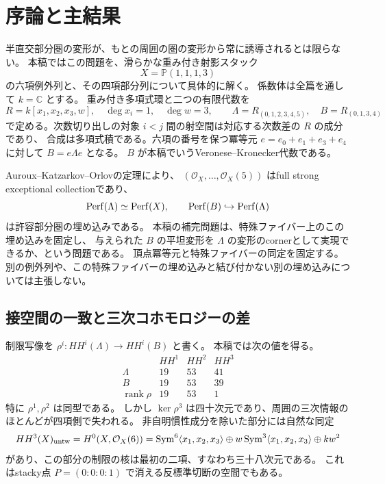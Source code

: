 \section{序論と主結果}

半直交部分圏の変形が、もとの周囲の圏の変形から常に誘導されるとは限らない。
本稿ではこの問題を、滑らかな重み付き射影スタック
\[
 X=\mathbb P(1,1,1,3)
\]
の六項例外列と、その四項部分列について具体的に解く。
係数体は全篇を通して $k=\mathbb C$ とする。
重み付き多項式環と二つの有限代数を
\[
 R=k[x_1,x_2,x_3,w],\quad \deg x_i=1,\quad\deg w=3,
 \qquad \Lambda=R_{(0,1,2,3,4,5)},\quad B=R_{(0,1,3,4)}
\]
で定める。次数切り出しの対象 $i<j$ 間の射空間は対応する次数差の $R$ の成分であり、
合成は多項式積である。六項の番号を保つ冪等元
$e=e_0+e_1+e_3+e_4$ に対して $B=e\Lambda e$ となる。
$B$ が本稿でいうVeronese--Kronecker代数である。

Auroux--Katzarkov--Orlovの定理\cite[Theorem 2.12]{AKO}により、
$(\mathcal O_X,\ldots,\mathcal O_X(5))$ はfull strong exceptional collectionであり、
\[
 \operatorname{Perf}(\Lambda)\simeq\operatorname{Perf}(X),\qquad
 \operatorname{Perf}(B)\hookrightarrow\operatorname{Perf}(\Lambda)
\]
は許容部分圏の埋め込みである。
本稿の補完問題は、特殊ファイバー上のこの埋め込みを固定し、
与えられた $B$ の平坦変形を $\Lambda$ の変形のcornerとして実現できるか、という問題である。
頂点冪等元と特殊ファイバーの同定を固定する。
別の例外列や、この特殊ファイバーの埋め込みと結び付かない別の埋め込みについては主張しない。

\subsection{接空間の一致と三次コホモロジーの差}

制限写像を $\rho^i:HH^i(\Lambda)\to HH^i(B)$ と書く。
本稿では次の値を得る。
\[
\begin{array}{c|rrr}
 &HH^1&HH^2&HH^3\\\hline
 \Lambda&19&53&41\\
 B&19&53&39\\
 \operatorname{rank}\rho&19&53&1
\end{array}
\]
特に $\rho^1,\rho^2$ は同型である。
しかし $\ker\rho^3$ は四十次元であり、周囲の三次情報のほとんどが四項側で失われる。
非自明慣性成分を除いた部分には自然な同定
\[
 HH^3(X)_{\rm untw}=H^0(X,\mathcal O_X(6))
 =\operatorname{Sym}^6\langle x_1,x_2,x_3\rangle
 \oplus w\operatorname{Sym}^3\langle x_1,x_2,x_3\rangle\oplus kw^2
\]
があり、この部分の制限の核は最初の二項、すなわち三十八次元である。
これはstacky点 $P=(0:0:0:1)$ で消える反標準切断の空間でもある。

